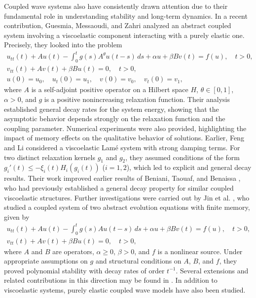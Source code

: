 \documentclass[10pt,a4paper]{amsart}
\numberwithin{equation}{section}
\begin{document}
Coupled wave systems also have consistently drawn attention due to their fundamental role in understanding stability and long-term dynamics. In a recent contribution, Guesmia, Messaoudi, and Zahri \cite{GASM} analyzed an abstract coupled system involving a viscoelastic component interacting with a purely elastic one. Precisely, they looked into the problem
\begin{gather*}
u_{tt}(t) + Au(t) - \int_0^{t} g(s) A^{\theta} u(t - s) \, ds + \alpha u + \beta B v(t) = f(u), \quad t > 0, \\
v_{tt}(t) + A v(t) + \beta B u(t) = 0, \quad t > 0,\\
u(0) = u_0, \quad u_t(0) = u_1, \quad v(0) = v_0, \quad v_t(0) = v_1,
\end{gather*}
 where $A$ is a self-adjoint positive operator on a Hilbert space $H$, $\theta \in [0,1]$,
 $\alpha > 0$, and $g$ is a positive nonincreasing relaxation function.
 Their analysis established general decay rates for the system energy, showing that the
 asymptotic behavior depends strongly on the relaxation function and the coupling parameter.
 Numerical experiments were also provided, highlighting the impact of memory effects on
 the qualitative behavior of solutions. Earlier, Feng and Li \cite{FengBaoweiHaiyan} considered
 a viscoelastic Lam\'e system with strong damping terms. For two distinct relaxation kernels
 $g_1$ and $g_2$, they assumed conditions of the form $g_i'(t) \leq -\xi_i(t) H_i(g_i(t))$
 ($i=1,2$), which led to explicit and general decay results. Their work improved earlier results
 of Beniani, Taouaf, and Benaissa \cite{Beniani}, who had previously established a general
 decay property for similar coupled viscoelastic structures.
Further investigations were carried out by Jin et al. \cite{JKJT}, who studied a coupled system of two abstract evolution equations with finite memory, given by
\begin{gather*}
 u_{tt}(t) + Au(t) - \int_0^{t} g(s) A u(t - s) \, ds + \alpha u + \beta B v(t)
 = f(u), \quad t > 0, \\
v_{tt}(t) + A v(t) + \beta B u(t) = 0, \quad t > 0,
 \end{gather*}
 where $A$ and $B$ are operators, $\alpha \geq 0$, $\beta > 0$, and $f$ is a nonlinear source.
 Under appropriate assumptions on $g$ and structural conditions on $A$, $B$, and $f$,
 they proved polynomial stability with decay rates of order $t^{-1}$. Several extensions and
related contributions in this direction may be found in \cite{ ORHC, AkilM}.
In addition to viscoelastic systems, purely elastic coupled wave models have also been studied.
\end{document}

